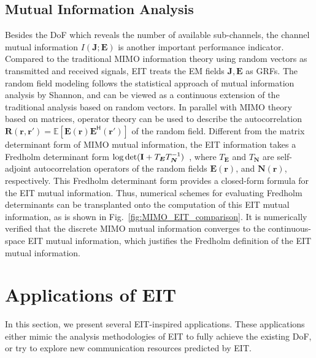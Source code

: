 \documentclass[journal,twocolumn]{IEEEtran}
\def \H {^{\mathsf{H}}}
\begin{document}
\subsection{Mutual Information Analysis} \label{sec_3_subsec_3}
Besides the DoF which reveals the number of available sub-channels, the channel mutual information $I({\bm J}; {\bm E})$ is another important performance indicator. 
Compared to the traditional MIMO information theory using random vectors as transmitted and received signals, EIT treats the EM fields ${\bm J}, {\bm E}$ as GRFs. 
The random field modeling follows the statistical approach of mutual information analysis by Shannon, and can be viewed as a continuous extension of the traditional analysis based on random vectors. 
In parallel with MIMO theory based on matrices, operator theory can be used to describe the autocorrelation ${\bm R}({\bm r}, {\bm r}')=\mathbb{E}[{{\bm E}({\bm r}){\bm E}\H ({\bm r}')}]$ of the random field. 
Different from the matrix determinant form of MIMO mutual information, the EIT information takes a Fredholm determinant form $\log\det({\bf I}+T_{\bm E}T_{\bm N}^{-1})$~\cite{wan2022mutual}, where $T_{\bm E}$ and $T_{\bm N}$ are self-adjoint autocorrelation operators of the random fields ${\bm E}({\bm r})$, and ${\bm N}({\bm r})$, respectively.  
This Fredholm determinant form provides a closed-form formula for the EIT mutual information. Thus, numerical schemes for evaluating Fredholm determinants can be transplanted onto the computation of this EIT mutual information, as is shown in Fig.~\ref{fig:MIMO_EIT_comparison}. It is numerically verified that the discrete MIMO mutual information converges to the continuous-space EIT mutual information, which justifies the Fredholm definition of the EIT mutual information. 

\section{Applications of EIT}
In this section, we present several EIT-inspired applications. 
These applications either mimic the analysis methodologies of EIT to fully achieve the existing DoF, or try to explore new communication resources predicted by EIT. 

\vspace{-1em}
\end{document}

